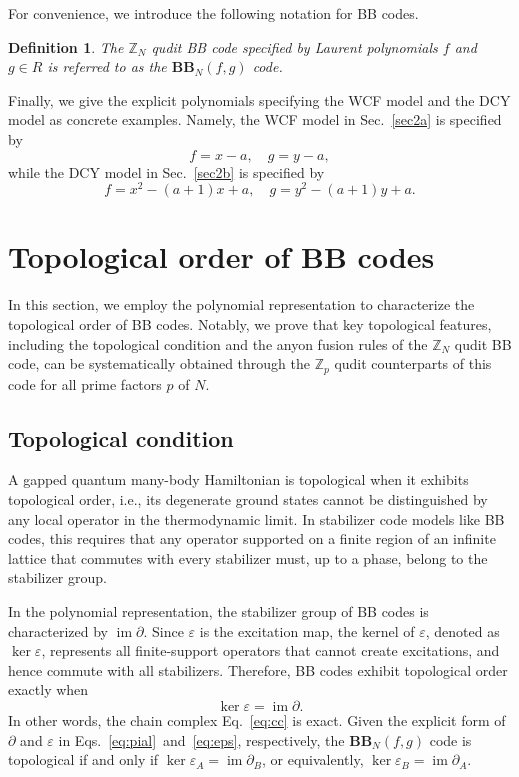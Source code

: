 \documentclass[aps,prb,english,superscriptaddress,twocolumn,tightenlines,showpacs,longbibliography,floatfix,amsfonts]{revtex4-2}
\newcommand{\im}{\operatorname{im}}
\newcommand{\eps}{\varepsilon}
\newtheorem{defn}{Definition}
\begin{document}
For convenience, we introduce the following notation for BB codes.
\begin{defn}
    The $\mathbb{Z}_N$ qudit BB code specified by Laurent polynomials $f$ and $g\in R$ is referred to as the $\mathbf{BB}_N(f,g)$ code.
\end{defn}

Finally, we give the explicit polynomials specifying the WCF model and the DCY model as concrete examples. Namely, the WCF model in Sec.~\ref{sec2a} is specified by
\begin{equation}
    f=x-a,\quad g=y-a,\label{eq:poly1}
\end{equation} 
while the DCY model in Sec.~\ref{sec2b} is specified by
\begin{equation}
    f=x^2-(a+1)x+a,\quad g=y^2-(a+1)y+a.\label{eq:poly2}
\end{equation}



\section{Topological order of BB codes\label{sec4}}
In this section, we employ the polynomial representation to characterize the topological order of BB codes. Notably, we prove that key topological features, including the topological condition and the anyon fusion rules of the $\mathbb{Z}_N$ qudit BB code, can be systematically obtained through the $\mathbb{Z}_p$ qudit counterparts of this code for all prime factors $p$ of $N$.
\subsection{Topological condition\label{sec4a}}
A gapped quantum many-body Hamiltonian is topological when it exhibits topological order, i.e., its degenerate ground states cannot be distinguished by any local operator in the thermodynamic limit. In stabilizer code models like BB codes, this requires that any operator supported on a finite region of an infinite lattice that commutes with every stabilizer must, up to a phase, belong to the stabilizer group.
  
In the polynomial representation, the stabilizer group of BB codes is characterized by $\im\partial$. Since $\eps$ is the excitation map, the kernel of $\eps$, denoted as $\ker\eps$, represents all finite-support operators that cannot create excitations, and hence commute with all stabilizers. Therefore, BB codes exhibit topological order exactly when
\begin{equation}
    \ker\eps=\im\partial.\label{eq:topo_condition}
\end{equation}
In other words, the chain complex Eq.~\eqref{eq:cc} is exact. Given the explicit form of $\partial$ and $\eps$ in Eqs.~\eqref{eq:pial}~and~\eqref{eq:eps}, respectively, the $\mathbf{BB}_N(f,g)$ code is topological if and only if $\ker\eps_A=\im\partial_B$, or equivalently, $\ker\eps_B=\im\partial_A$.
  
\end{document}
